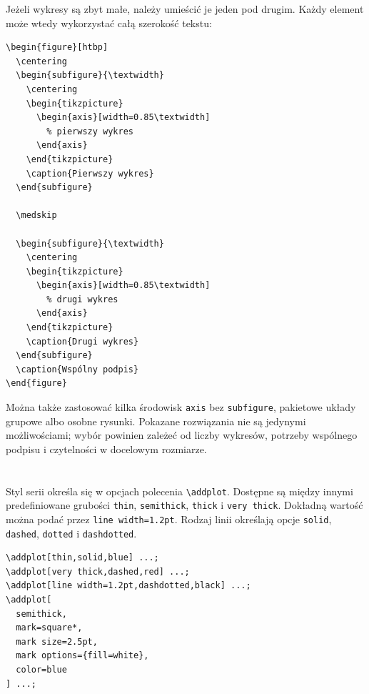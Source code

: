 Jeżeli wykresy są zbyt małe, należy umieścić je jeden pod drugim. Każdy element może wtedy wykorzystać całą szerokość tekstu:

\begin{lstlisting}[caption={\ploren{Dwa wykresy jeden pod drugim}{Two plots stacked vertically}}]
\begin{figure}[htbp]
  \centering
  \begin{subfigure}{\textwidth}
    \centering
    \begin{tikzpicture}
      \begin{axis}[width=0.85\textwidth]
        % pierwszy wykres
      \end{axis}
    \end{tikzpicture}
    \caption{Pierwszy wykres}
  \end{subfigure}

  \medskip

  \begin{subfigure}{\textwidth}
    \centering
    \begin{tikzpicture}
      \begin{axis}[width=0.85\textwidth]
        % drugi wykres
      \end{axis}
    \end{tikzpicture}
    \caption{Drugi wykres}
  \end{subfigure}
  \caption{Wspólny podpis}
\end{figure}
\end{lstlisting}

Można także zastosować kilka środowisk \texttt{axis} bez \texttt{subfigure}, pakietowe układy grupowe albo osobne rysunki. Pokazane rozwiązania nie są jedynymi możliwościami; wybór powinien zależeć od liczby wykresów, potrzeby wspólnego podpisu i czytelności w docelowym rozmiarze.

\section{}

Styl serii określa się w opcjach polecenia \verb|\addplot|. Dostępne są między innymi predefiniowane grubości \texttt{thin}, \texttt{semithick}, \texttt{thick} i \texttt{very thick}. Dokładną wartość można podać przez \verb|line width=1.2pt|. Rodzaj linii określają opcje \texttt{solid}, \texttt{dashed}, \texttt{dotted} i \texttt{dashdotted}.

\begin{lstlisting}[caption={\ploren{Przykłady zmiany stylu serii danych}{Examples of changing a data-series style}}]
\addplot[thin,solid,blue] ...;
\addplot[very thick,dashed,red] ...;
\addplot[line width=1.2pt,dashdotted,black] ...;
\addplot[
  semithick,
  mark=square*,
  mark size=2.5pt,
  mark options={fill=white},
  color=blue
] ...;
\end{lstlisting}

